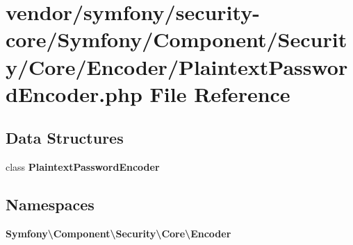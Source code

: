 \section{vendor/symfony/security-\/core/\+Symfony/\+Component/\+Security/\+Core/\+Encoder/\+Plaintext\+Password\+Encoder.php File Reference}
\label{_plaintext_password_encoder_8php}
\subsection*{Data Structures}
\begin{DoxyCompactItemize}
\item 
class {\bf Plaintext\+Password\+Encoder}
\end{DoxyCompactItemize}
\subsection*{Namespaces}
\begin{DoxyCompactItemize}
\item 
 {\bf Symfony\textbackslash{}\+Component\textbackslash{}\+Security\textbackslash{}\+Core\textbackslash{}\+Encoder}
\end{DoxyCompactItemize}
